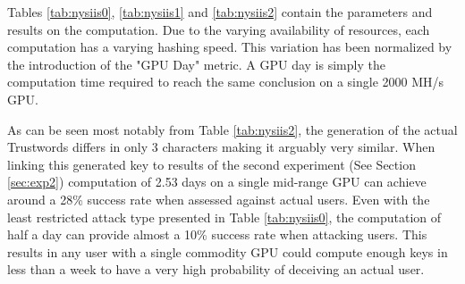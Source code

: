 Tables \ref{tab:nysiis0}, \ref{tab:nysiis1} and \ref{tab:nysiis2} contain the parameters and results on the computation. Due to the varying availability of resources, each computation has a varying hashing speed. This variation has been normalized by the introduction of the "GPU Day" metric. A GPU day is simply the computation time required to reach the same conclusion on a single 2000 MH/s GPU. 

As can be seen most notably from Table \ref{tab:nysiis2}, the generation of the actual Trustwords differs in only 3 characters making it arguably very similar. When linking this generated key to results of the second experiment (See Section \ref{sec:exp2}) computation of 2.53 days on a single mid-range GPU can achieve around a 28\% success rate when assessed against actual users. Even with the least restricted attack type presented in Table \ref{tab:nysiis0}, the computation of half a day can provide almost a 10\% success rate when attacking users. This results in any user with a single commodity GPU could compute enough keys in less than a week to have a very high probability of deceiving an actual user.
